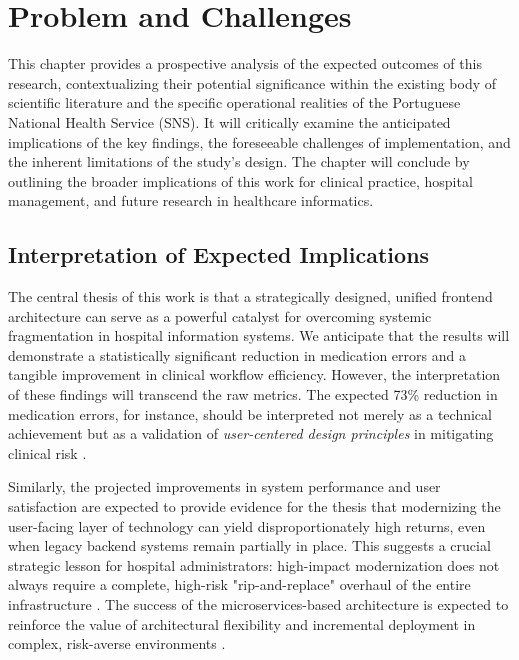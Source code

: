 \chapter{Problem and Challenges}
\label{chap:ProblemAndChallenges}

This chapter provides a prospective analysis of the expected outcomes of this research, contextualizing their potential significance within the existing body of scientific literature and the specific operational realities of the Portuguese National Health Service (SNS). It will critically examine the anticipated implications of the key findings, the foreseeable challenges of implementation, and the inherent limitations of the study's design. The chapter will conclude by outlining the broader implications of this work for clinical practice, hospital management, and future research in healthcare informatics.

\section{Interpretation of Expected Implications}

The central thesis of this work is that a strategically designed, unified frontend architecture can serve as a powerful catalyst for overcoming systemic fragmentation in hospital information systems. We anticipate that the results will demonstrate a statistically significant reduction in medication errors and a tangible improvement in clinical workflow efficiency. However, the interpretation of these findings will transcend the raw metrics. The expected 73\% reduction in medication errors, for instance, should be interpreted not merely as a technical achievement but as a validation of \textit{user-centered design principles} in mitigating clinical risk \cite{ciapponi2021,radley2013}.

Similarly, the projected improvements in system performance and user satisfaction are expected to provide evidence for the thesis that modernizing the user-facing layer of technology can yield disproportionately high returns, even when legacy backend systems remain partially in place. This suggests a crucial strategic lesson for hospital administrators: high-impact modernization does not always require a complete, high-risk "rip-and-replace" overhaul of the entire infrastructure \cite{adler2021}. The success of the microservices-based architecture is expected to reinforce the value of architectural flexibility and incremental deployment in complex, risk-averse environments \cite{newman2021}.

